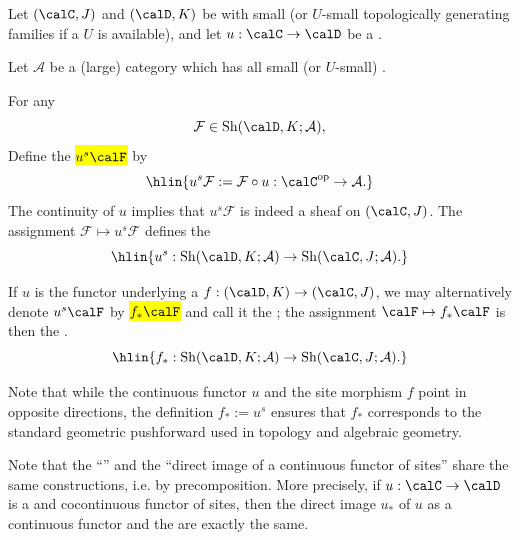 \begin{definition} \label{definition:direct_image_of_a_sheaf_on_a_site_under_a_continuous_functor_of_sites_or_a_site_morphism}
Let $(\calC,J)$ and $(\calD,K)$ be   with small  (or $U$-small topologically generating families if a  $U$ is available), and let $u : \calC \to \calD$ be a . 

Let $\mathcal{A}$ be a (large) category which has all small (or $U$-small) .

For any  
\[
\mathcal{F} \in \operatorname{Sh}(\calD,K;\mathcal{A}),
\]
Define the  \hl{$u^s \calF$} by 
$$\hlin{u^s \mathcal{F} := \mathcal{F} \circ u : \calC^{\mathrm{op}} \to \mathcal{A}.}$$
The continuity of $u$ implies that $u^s\mathcal{F}$ is indeed a sheaf on $(\calC,J)$. The assignment $\mathcal{F} \mapsto u^s\mathcal{F}$ defines the 
$$\hlin{u^s : \operatorname{Sh}(\calD,K;\mathcal{A}) \to \operatorname{Sh}(\calC,J;\mathcal{A}).}$$

If $u$ is the functor underlying a  $f: (\calD, K) \to (\calC, J)$, we may alternatively denote $u^s \calF$ by \hl{$f_* \calF$} and call it the ; the assignment $\calF \mapsto f_* \calF$ is then the .
$$\hlin{f_* : \operatorname{Sh}(\calD,K;\mathcal{A}) \to \operatorname{Sh}(\calC,J;\mathcal{A}).}$$

Note that while the continuous functor $u$ and the site morphism $f$ point in opposite directions, the definition $f_* := u^s$ ensures that $f_*$ corresponds to the standard geometric pushforward used in topology and algebraic geometry.


Note that the ``'' and the ``direct image of a continuous functor of sites'' share the same constructions, i.e. by precomposition. More precisely, if $u: \calC \to \calD$ is a  and cocontinuous functor of sites, then the direct image $u_*$ of $u$ as a continuous functor and the  are exactly the same.



\end{definition}
